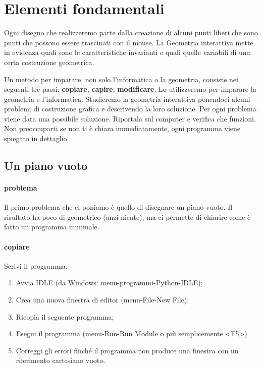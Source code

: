 \section{Elementi fondamentali}
\label{sec:geo_int_elementi_fondamentali}

Ogni disegno che realizzeremo parte dalla creazione di alcuni punti liberi che 
sono punti che possono essere trascinati con il mouse. La Geometria interattiva 
mette in evidenza quali sono le caratteristiche invarianti e quali quelle 
variabili di una certa costruzione geometrica.

Un metodo per imparare, non solo l'informatica o la geometria, consiste nei 
seguenti tre passi: \textbf{copiare}, \textbf{capire}, \textbf{modificare}.
Lo utilizzeremo per imparare la geometria e l'informatica.
Studieremo la geometria interattiva ponendoci alcuni problemi di costruzione 
grafica e descrivendo la loro soluzione. Per ogni problema viene data una 
possibile soluzione. Riportala sul computer e verifica che funzioni. Non 
preoccuparti se non ti è chiara immediatamente, ogni programma viene spiegato 
in dettaglio. 

\subsection{Un piano vuoto}
\label{subsec:geo_int_pianovuoto}

\paragraph{problema}
Il primo problema che ci poniamo è quello di disegnare un piano vuoto. Il 
risultato ha poco di geometrico (anzi niente), ma ci permette di chiarire come 
è fatto un programma minimale.

\paragraph{copiare}

\begin{procedura}
Scrivi il programma.
\begin{enumerate} [noitemsep]
 \item Avvia IDLE (da Windows: menu-programmi-Python-IDLE);
 \item Crea una nuova finestra di editor (menu-File-New File);
 \item Ricopia il seguente programma;
 \item Esegui il programma (menu-Run-Run Module o più semplicemente <F5>)
 \item Correggi gli errori finché il programma non produce una finestra con un 
riferimento cartesiano vuoto.
\end{enumerate}
\end{procedura}

